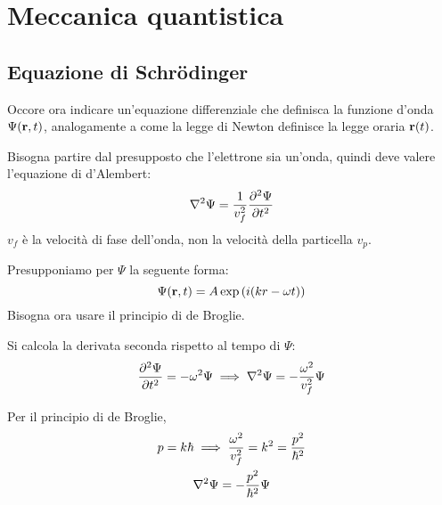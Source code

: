 \chapter{Meccanica quantistica}

\section{Equazione di Schrödinger}

Occore ora indicare un'equazione differenziale che definisca la funzione d'onda $\Psi(\mathbf{r}, t)$, analogamente a come la legge di Newton definisce la legge oraria $\mathbf{r}(t)$.


Bisogna partire dal presupposto che l'elettrone sia un'onda, quindi deve valere l'equazione di d'Alembert:
\begin{equation}
    \lapl \Psi = \frac{1}{v_f^2} \parder[\Psi][2]{t}
\end{equation}
$v_f$ è la velocità di fase dell'onda, non la velocità della particella $v_p$.

Presupponiamo per $\Psi$ la seguente forma:
\begin{equation}
    \Psi(\mathbf{r}, t) = A \operatorname{exp}\left( i (k r - \omega t) \right)
\end{equation}
Bisogna ora usare il principio di de Broglie.

Si calcola la derivata seconda rispetto al tempo di $\Psi$:
\begin{equation}
    \parder[\Psi][2]{t} = - \omega^2 \Psi
    \implies \lapl \Psi = - \frac{\omega^2}{v_f^2} \Psi
\end{equation}

Per il principio di de Broglie,
\begin{gather}
    p = k \hbar \implies
    \frac{\omega^2}{v_f^2} = k^2 = \frac{p^2}{\hbar^2} \\
    \nabla^2 \Psi = - \frac{p^2}{\hbar^2} \Psi
\end{gather}

